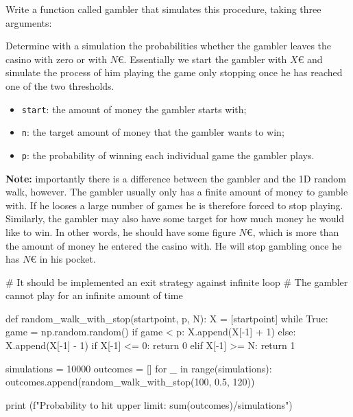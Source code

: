 \documentclass[12pt,a4paper]{book}
\begin{document}
\begin{exercise}[subtitle={Simulating a Gambler (\texttt{python})}]
Write a function called gambler that simulates this procedure, taking three arguments:

Determine with a simulation the probabilities whether the gambler leaves the casino with zero or with $N$€.
Essentially we start the gambler with $X$€ and simulate the process of him playing the game only stopping once he has reached one of the two thresholds.

\begin{itemize}
\item \texttt{start}: the amount of money the gambler starts with; \item \texttt{n}: the target amount of money that the gambler wants to win;
\item \texttt{p}: the probability of winning each individual game the gambler plays.
\end{itemize}

\textbf{Note: } importantly there is a difference between the gambler and the 1D random walk, however. The gambler usually only has a finite amount of money to gamble with. If he looses a large number of games he is therefore forced to stop playing. Similarly, the gambler may also have some target for how much money he would like to win. In other words, he should have some figure $N$€, which is more than the amount of money he entered the casino with. He will stop gambling once he has $N$€ in his pocket.
\end{exercise}
\begin{solution}
\begin{ipython}
# It should be implemented an exit strategy against infinite loop
# The gambler cannot play for an infinite amount of time

def random_walk_with_stop(startpoint, p, N):
    X = [startpoint]
    while True:
        game = np.random.random()
        if game < p:
            X.append(X[-1] + 1)
        else:
            X.append(X[-1] - 1)
        if X[-1] <= 0:
            return 0
        elif X[-1] >= N:
            return 1

simulations = 10000
outcomes = []
for _ in range(simulations):
    outcomes.append(random_walk_with_stop(100, 0.5, 120))

print (f"Probability to hit upper limit: {sum(outcomes)/simulations}")
\end{ipython}
\end{solution}
\end{document}
